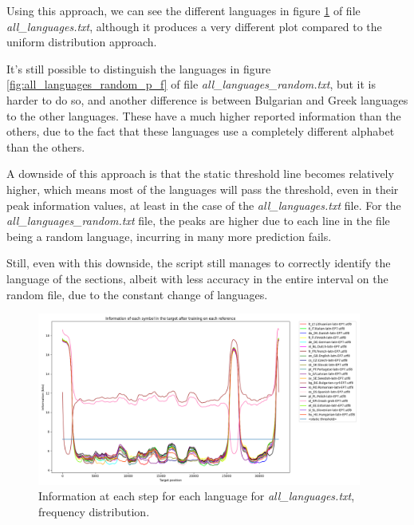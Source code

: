 \documentclass{article}
\begin{document}
Using this approach, we can see the different languages in figure \ref{fig:all_languages_p_f} of file \textit{all\_languages.txt}, although it produces a very different plot
compared to the uniform distribution approach.

It's still possible to distinguish the languages in figure \ref{fig:all_languages_random_p_f} of file \textit{all\_languages\_random.txt}, but it is harder to do so,
and another difference is between Bulgarian and Greek languages to the other languages. These have a much higher reported information than the others, due to the fact that these
languages use a completely different alphabet than the others.

A downside of this approach is that the static threshold line becomes relatively higher, which means most of the languages will pass the threshold, even in their peak information values,
at least in the case of the \textit{all\_languages.txt} file. For the \textit{all\_languages\_random.txt} file, the peaks are higher due to each line in the file being a random language, incurring in many more prediction fails.

Still, even with this downside, the script still manages to correctly identify the language of the sections, albeit with less accuracy in the entire interval on the random file,
due to the constant change of languages.

\begin{figure}
    \centering
    \includegraphics[width=0.95\textwidth]{../results/all_languages/-p_f.png}
    \caption{Information at each step for each language for \textit{all\_languages.txt}, frequency distribution.}
    \label{fig:all_languages_p_f}
\end{figure}
\end{document}

